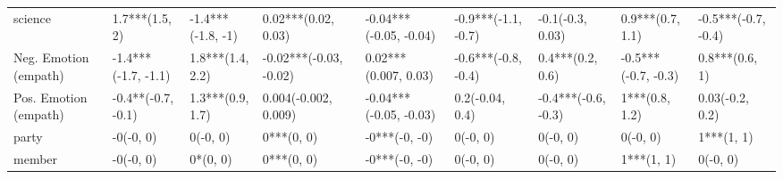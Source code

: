 \begin{tabular}{lllllllll}
science               &       1.7***(1.5, 2) &  -1.4***(-1.8, -1) &      0.02***(0.02, 0.03) &  -0.04***(-0.05, -0.04) &  -0.9***(-1.1, -0.7) &     -0.1(-0.3, 0.03) &     0.9***(0.7, 1.1) &  -0.5***(-0.7, -0.4) \\
Neg. Emotion (empath) &  -1.4***(-1.7, -1.1) &   1.8***(1.4, 2.2) &   -0.02***(-0.03, -0.02) &    0.02***(0.007, 0.03) &  -0.6***(-0.8, -0.4) &     0.4***(0.2, 0.6) &  -0.5***(-0.7, -0.3) &       0.8***(0.6, 1) \\
Pos. Emotion (empath) &   -0.4**(-0.7, -0.1) &   1.3***(0.9, 1.7) &     0.004(-0.002, 0.009) &  -0.04***(-0.05, -0.03) &      0.2(-0.04, 0.4) &  -0.4***(-0.6, -0.3) &       1***(0.8, 1.2) &      0.03(-0.2, 0.2) \\
party                 &            -0(-0, 0) &           0(-0, 0) &               0***(0, 0) &           -0***(-0, -0) &             0(-0, 0) &             0(-0, 0) &             0(-0, 0) &           1***(1, 1) \\
member                &            -0(-0, 0) &           0*(0, 0) &               0***(0, 0) &           -0***(-0, -0) &             0(-0, 0) &             0(-0, 0) &           1***(1, 1) &             0(-0, 0) \\
\bottomrule
\end{tabular}
